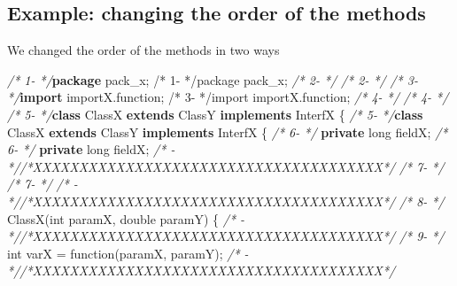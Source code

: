 \documentclass[
]{article}
\newenvironment{Shaded}{\begin{snugshade}}{\end{snugshade}}
\newcommand{\CommentTok}[1]{\textcolor[rgb]{0.56,0.35,0.01}{\textit{#1}}}
\newcommand{\DataTypeTok}[1]{\textcolor[rgb]{0.13,0.29,0.53}{#1}}
\newcommand{\FunctionTok}[1]{\textcolor[rgb]{0.00,0.00,0.00}{#1}}
\newcommand{\ImportTok}[1]{#1}
\newcommand{\KeywordTok}[1]{\textcolor[rgb]{0.13,0.29,0.53}{\textbf{#1}}}
\newcommand{\NormalTok}[1]{#1}
\begin{document}
\begin{landscape}

\subsection{Example: changing the order of the methods} \label{example_editing_line}

We changed the order of the methods in two ways

\small

\normalsize

\scriptsize

\begin{Shaded}
\begin{Highlighting}[]
\CommentTok{/*  1-   */}\KeywordTok{package}\ImportTok{ pack_x;                                          /*  1-   */package pack_x;}                                          
\CommentTok{/*  2-   */}                                                         \CommentTok{/*  2-   */}                                                         
\CommentTok{/*  3-   */}\KeywordTok{import}\ImportTok{ importX.function;                                 /*  3-   */import importX.function;}                                 
\CommentTok{/*  4-   */}                                                         \CommentTok{/*  4-   */}                                                         
\CommentTok{/*  5-   */}\KeywordTok{class}\NormalTok{ ClassX }\KeywordTok{extends}\NormalTok{ ClassY }\KeywordTok{implements}\NormalTok{ InterfX \{         }\CommentTok{/*  5-   */}\KeywordTok{class}\NormalTok{ ClassX }\KeywordTok{extends}\NormalTok{ ClassY }\KeywordTok{implements}\NormalTok{ InterfX \{         }
\CommentTok{/*  6-   */}    \KeywordTok{private} \DataTypeTok{long}\NormalTok{ fieldX;                                 }\CommentTok{/*  6-   */}    \KeywordTok{private} \DataTypeTok{long}\NormalTok{ fieldX;                                 }
\CommentTok{/*   -   *//*XXXXXXXXXXXXXXXXXXXXXXXXXXXXXXXXXXXXXX*/}               \CommentTok{/*  7-   */}                                                         
\CommentTok{/*  7-   */}                                                         \CommentTok{/*   -   *//*XXXXXXXXXXXXXXXXXXXXXXXXXXXXXXXXXXXXXX*/}               
\CommentTok{/*  8-   */}    \FunctionTok{ClassX}\NormalTok{(}\DataTypeTok{int}\NormalTok{ paramX, }\DataTypeTok{double}\NormalTok{ paramY) \{                        }\CommentTok{/*   -   *//*XXXXXXXXXXXXXXXXXXXXXXXXXXXXXXXXXXXXXX*/}               
\CommentTok{/*  9-   */}        \DataTypeTok{int}\NormalTok{ varX = }\FunctionTok{function}\NormalTok{(paramX, paramY);                  }\CommentTok{/*   -   *//*XXXXXXXXXXXXXXXXXXXXXXXXXXXXXXXXXXXXXX*/}               

\end{Highlighting}
\end{Shaded}
\end{landscape}
\end{document}
